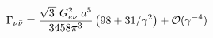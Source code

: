 \begin{equation}
\Gamma_{\nu {\bar \nu}}=
\frac{\sqrt{3\,} \; G_{e\nu}^2\;a^5 }{3458 \pi^3} 
\left( 98 + 31/\gamma^2\right) + {\cal O} (\gamma^{-4})\;
\label{GNU}
\end{equation}

